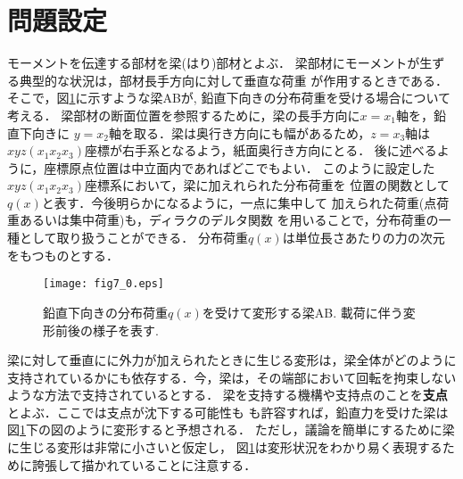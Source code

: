 \documentclass[10pt,a4j]{jbook}
\begin{document}
\section{問題設定}
モーメントを伝達する部材を梁(はり)部材とよぶ．
梁部材にモーメントが生ずる典型的な状況は，部材長手方向に対して垂直な荷重
が作用するときである．そこで，図\ref{fig:fig7_0}に示すような梁ABが, 
鉛直下向きの分布荷重を受ける場合について考える．
梁部材の断面位置を参照するために，梁の長手方向に$x=x_1$軸を，鉛直下向きに
$y=x_2$軸を取る．梁は奥行き方向にも幅があるため，$z=x_3$軸は
$xyz(x_1x_2x_3)$座標が右手系となるよう，紙面奥行き方向にとる．
後に述べるように，座標原点位置は中立面内であればどこでもよい．
このように設定した$xyz(x_1x_2x_3)$座標系において，梁に加えれられた分布荷重を
位置の関数として$q(x)$と表す．今後明らかになるように，一点に集中して
加えられた荷重(点荷重あるいは集中荷重)も，ディラクのデルタ関数
を用いることで，分布荷重の一種として取り扱うことができる．
分布荷重$q(x)$は単位長さあたりの力の次元をもつものとする．
\begin{figure}[h]
	\begin{center}
	\texttt{[image: fig7\_0.eps]} 
	\end{center}
	\caption{
		鉛直下向きの分布荷重$q(x)$を受けて変形する梁AB.
		載荷に伴う変形前後の様子を表す. 
	} 
	\label{fig:fig7_0}
\end{figure}
梁に対して垂直にに外力が加えられたときに生じる変形は，梁全体がどのように
支持されているかにも依存する．今，梁は，その端部において回転を拘束しない
ような方法で支持されているとする．
梁を支持する機構や支持点のことを{\bf 支点}とよぶ．ここでは支点が沈下する可能性も
も許容すれば，鉛直力を受けた梁は図\ref{fig:fig7_0}下の図のように変形すると予想される．
ただし，議論を簡単にするために梁に生じる変形は非常に小さいと仮定し，
図\ref{fig:fig7_0}は変形状況をわかり易く表現するために誇張して描かれていることに注意する．
\end{document}
